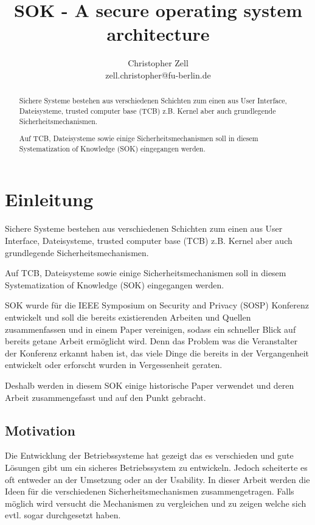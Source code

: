 \documentclass[9pt,technote]{IEEEtran}
\title{SOK - A secure operating system architecture}
\author{Christopher Zell\\
        zell.christopher@fu-berlin.de}
\begin{document}
\maketitle

  \begin{abstract}
    Sichere Systeme bestehen aus verschiedenen Schichten zum einen aus
    User Interface, Dateisysteme, trusted computer base (TCB) z.B. Kernel aber auch
    grundlegende Sicherheitsmechanismen.
    
    Auf TCB, Dateisysteme sowie einige Sicherheitsmechanismen soll in diesem
    Systematization of Knowledge (SOK) eingegangen werden.
    
  \end{abstract}
  
  \section{Einleitung} \label{sec:intro}
    Sichere Systeme bestehen aus verschiedenen Schichten zum einen aus
    User Interface, Dateisysteme, trusted computer base (TCB) z.B. Kernel aber auch
    grundlegende Sicherheitsmechanismen.
    
    Auf TCB, Dateisysteme sowie einige Sicherheitsmechanismen soll in diesem
    Systematization of Knowledge (SOK) eingegangen werden.
    
    SOK wurde f\"ur die IEEE Symposium on Security and Privacy (SOSP) Konferenz
    entwickelt und soll die bereits existierenden Arbeiten und Quellen zusammenfassen
    und in einem Paper vereinigen, sodass ein schneller Blick auf bereits getane
    Arbeit erm\"oglicht wird. Denn das Problem was die Veranstalter der Konferenz
    erkannt haben ist, das viele Dinge die bereits in der Vergangenheit entwickelt oder
    erforscht wurden in Vergessenheit geraten.
    
    Deshalb werden in diesem SOK einige historische Paper verwendet und deren Arbeit
    zusammengefasst und auf den Punkt gebracht.
    
    \subsection{Motivation}
      Die Entwicklung der Betriebssysteme hat gezeigt das es verschieden und gute L\"osungen gibt um ein sicheres Betriebssystem zu entwickeln.
      Jedoch scheiterte es oft entweder an der Umsetzung oder an der Usability. 
      In dieser Arbeit werden die Ideen f\"ur die verschiedenen Sicherheitsmechanismen  zusammengetragen.
      Falls m\"oglich wird versucht die Mechanismen zu vergleichen und zu zeigen welche sich evtl. sogar durchgesetzt haben.
\end{document}
